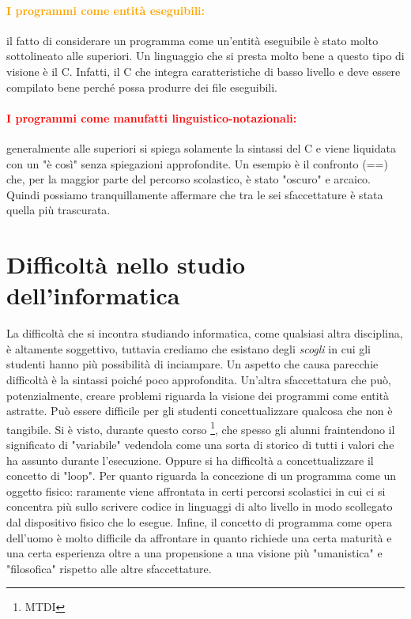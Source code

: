 \paragraph{\textcolor{orange}{I programmi come entità eseguibili:}}
il fatto di considerare un programma come un'entità eseguibile è
stato molto sottolineato alle superiori. Un linguaggio
che si presta molto bene a
questo tipo di visione è il C. Infatti, il C che integra caratteristiche di
basso livello e deve essere compilato bene perché possa produrre dei file
eseguibili. 

\paragraph{\textcolor{red}{I programmi come manufatti linguistico-notazionali:}}
generalmente alle superiori si spiega solamente la sintassi del C e viene liquidata
con un "è così" senza spiegazioni approfondite. Un esempio è il confronto
(==) che, per la maggior parte del percorso scolastico, è stato "oscuro"
e arcaico. Quindi possiamo tranquillamente affermare che tra le sei sfaccettature
è stata quella più trascurata.


\section{Difficoltà nello studio dell'informatica}

La difficoltà che si incontra studiando informatica, come qualsiasi altra
disciplina, è altamente soggettivo, tuttavia crediamo che esistano degli \textit{scogli}
in cui gli studenti hanno più possibilità di inciampare. Un aspetto che causa 
parecchie difficoltà è la sintassi poiché poco approfondita.
Un'altra sfaccettatura che può, potenzialmente, creare problemi riguarda la 
visione dei programmi come entità astratte. Può essere difficile per gli
studenti concettualizzare qualcosa che non è tangibile. Si è visto, durante
questo corso \footnote{MTDI}, che spesso gli alunni fraintendono il significato
di "variabile" vedendola come una sorta di storico di tutti i valori che ha assunto
durante l'esecuzione. Oppure si ha difficoltà a concettualizzare il concetto
di "loop".
Per quanto riguarda la concezione di un programma come un oggetto fisico: raramente
viene affrontata in certi percorsi scolastici in cui ci si concentra più sullo
scrivere codice in linguaggi di alto livello in modo scollegato dal dispositivo 
fisico che lo esegue. Infine, il concetto di programma come opera dell'uomo
è molto difficile da affrontare in quanto richiede una certa maturità e una
certa esperienza oltre a una propensione a una visione più "umanistica" e "filosofica"
rispetto alle altre sfaccettature.

